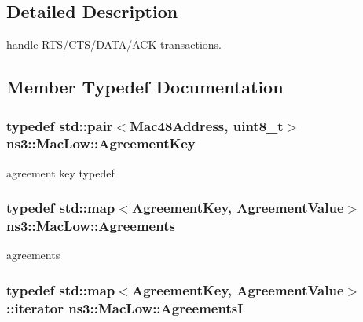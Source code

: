 \subsection{Detailed Description}
handle R\+T\+S/\+C\+T\+S/\+D\+A\+T\+A/\+A\+CK transactions. 

\subsection{Member Typedef Documentation}
\subsubsection[{\texorpdfstring{Agreement\+Key}{AgreementKey}}]{\setlength{\rightskip}{0pt plus 5cm}typedef std\+::pair$<${\bf Mac48\+Address}, uint8\+\_\+t$>$ {\bf ns3\+::\+Mac\+Low\+::\+Agreement\+Key}\hspace{0.3cm}{\ttfamily [private]}}\hypertarget{classns3_1_1MacLow_a8d666357756bbc5ea2d1b7fac3a5e938}{}\label{classns3_1_1MacLow_a8d666357756bbc5ea2d1b7fac3a5e938}


agreement key typedef 

\subsubsection[{\texorpdfstring{Agreements}{Agreements}}]{\setlength{\rightskip}{0pt plus 5cm}typedef std\+::map$<${\bf Agreement\+Key}, {\bf Agreement\+Value}$>$ {\bf ns3\+::\+Mac\+Low\+::\+Agreements}\hspace{0.3cm}{\ttfamily [private]}}\hypertarget{classns3_1_1MacLow_ad19858356831469ee643891fca0ef6a3}{}\label{classns3_1_1MacLow_ad19858356831469ee643891fca0ef6a3}


agreements 

\subsubsection[{\texorpdfstring{AgreementsI}{AgreementsI}}]{\setlength{\rightskip}{0pt plus 5cm}typedef std\+::map$<${\bf Agreement\+Key}, {\bf Agreement\+Value}$>$\+::iterator {\bf ns3\+::\+Mac\+Low\+::\+AgreementsI}\hspace{0.3cm}{\ttfamily [private]}}\hypertarget{classns3_1_1MacLow_a7876cc9b328cdb0508f2a7b7647eab10}{}\label{classns3_1_1MacLow_a7876cc9b328cdb0508f2a7b7647eab10}


